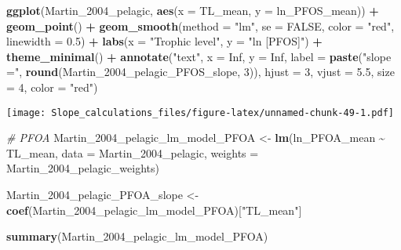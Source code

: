 \documentclass[
]{article}
\newenvironment{Shaded}{\begin{snugshade}}{\end{snugshade}}
\newcommand{\AttributeTok}[1]{\textcolor[rgb]{0.13,0.29,0.53}{#1}}
\newcommand{\CommentTok}[1]{\textcolor[rgb]{0.56,0.35,0.01}{\textit{#1}}}
\newcommand{\ConstantTok}[1]{\textcolor[rgb]{0.56,0.35,0.01}{#1}}
\newcommand{\DecValTok}[1]{\textcolor[rgb]{0.00,0.00,0.81}{#1}}
\newcommand{\FloatTok}[1]{\textcolor[rgb]{0.00,0.00,0.81}{#1}}
\newcommand{\FunctionTok}[1]{\textcolor[rgb]{0.13,0.29,0.53}{\textbf{#1}}}
\newcommand{\NormalTok}[1]{#1}
\newcommand{\OtherTok}[1]{\textcolor[rgb]{0.56,0.35,0.01}{#1}}
\newcommand{\SpecialCharTok}[1]{\textcolor[rgb]{0.81,0.36,0.00}{\textbf{#1}}}
\newcommand{\StringTok}[1]{\textcolor[rgb]{0.31,0.60,0.02}{#1}}
\begin{document}
\begin{Shaded}
\begin{Highlighting}[]
\FunctionTok{ggplot}\NormalTok{(Martin\_2004\_pelagic, }\FunctionTok{aes}\NormalTok{(}\AttributeTok{x =}\NormalTok{ TL\_mean, }\AttributeTok{y =}\NormalTok{ ln\_PFOS\_mean)) }\SpecialCharTok{+}
  \FunctionTok{geom\_point}\NormalTok{() }\SpecialCharTok{+}
  \FunctionTok{geom\_smooth}\NormalTok{(}\AttributeTok{method =} \StringTok{"lm"}\NormalTok{, }\AttributeTok{se =} \ConstantTok{FALSE}\NormalTok{, }\AttributeTok{color =} \StringTok{"red"}\NormalTok{, }\AttributeTok{linewidth =} \FloatTok{0.5}\NormalTok{) }\SpecialCharTok{+}
  \FunctionTok{labs}\NormalTok{(}\AttributeTok{x =} \StringTok{"Trophic level"}\NormalTok{,}
       \AttributeTok{y =} \StringTok{"ln [PFOS]"}\NormalTok{) }\SpecialCharTok{+}
  \FunctionTok{theme\_minimal}\NormalTok{() }\SpecialCharTok{+}
  \FunctionTok{annotate}\NormalTok{(}\StringTok{"text"}\NormalTok{, }\AttributeTok{x =} \ConstantTok{Inf}\NormalTok{, }\AttributeTok{y =} \ConstantTok{Inf}\NormalTok{, }\AttributeTok{label =} \FunctionTok{paste}\NormalTok{(}\StringTok{"slope ="}\NormalTok{, }\FunctionTok{round}\NormalTok{(Martin\_2004\_pelagic\_PFOS\_slope, }\DecValTok{3}\NormalTok{)), }
           \AttributeTok{hjust =} \DecValTok{3}\NormalTok{, }\AttributeTok{vjust =} \FloatTok{5.5}\NormalTok{, }\AttributeTok{size =} \DecValTok{4}\NormalTok{, }\AttributeTok{color =} \StringTok{"red"}\NormalTok{)}
\end{Highlighting}
\end{Shaded}

\texttt{[image: Slope\_calculations\_files/figure-latex/unnamed-chunk-49-1.pdf]}

\begin{Shaded}
\begin{Highlighting}[]
\CommentTok{\# PFOA}
\NormalTok{Martin\_2004\_pelagic\_lm\_model\_PFOA }\OtherTok{\textless{}{-}} \FunctionTok{lm}\NormalTok{(ln\_PFOA\_mean }\SpecialCharTok{\textasciitilde{}}\NormalTok{ TL\_mean, }
                                        \AttributeTok{data =}\NormalTok{ Martin\_2004\_pelagic,}
                                        \AttributeTok{weights =}\NormalTok{ Martin\_2004\_pelagic\_weights)}

\NormalTok{Martin\_2004\_pelagic\_PFOA\_slope }\OtherTok{\textless{}{-}} \FunctionTok{coef}\NormalTok{(Martin\_2004\_pelagic\_lm\_model\_PFOA)[}\StringTok{"TL\_mean"}\NormalTok{]}

\FunctionTok{summary}\NormalTok{(Martin\_2004\_pelagic\_lm\_model\_PFOA)}
\end{Highlighting}
\end{Shaded}
\end{document}
